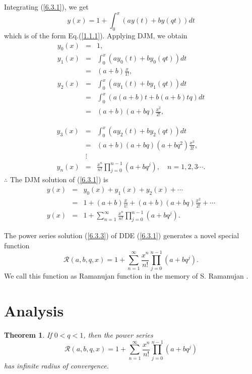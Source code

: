 \documentclass[12pt]{article}
\newtheorem{The}{Theorem}[section]
\numberwithin{equation}{section}
\begin{document}
Integrating (\ref{6.3.1}), we get
\begin{equation}
y(x)= 1 + \int_{0}^{x}\left( ay(t)+ by(qt)\right)dt\label{6.3.2}
\end{equation}
which is of the form Eq.(\ref{1.1.1}). Applying DJM, we obtain
\begin{eqnarray}
y_0(x) &=& 1 ,\nonumber\\
y_1(x)&=& \int_{0}^{x}\left( ay_0(t)+ by_0(q t)\right)dt\nonumber\\
&=& (a+b)\frac{x}{1!},\nonumber\\
y_2(x)&=& \int_{0}^{x}\left( ay_1(t)+ by_1(q t)\right)dt\nonumber\\
&=&\int_{0}^{x}\left(a (a+b)t + b (a+b)tq\right)dt\nonumber\\
&=& (a+b)(a+bq)\frac{x^2}{2!},\nonumber
\end{eqnarray}

\begin{eqnarray}
y_3(x)&=&  \int_{0}^{x}\left(ay_2(t)+ by_2(q t)\right)dt\nonumber\\
&=& (a+b)(a+bq)(a+bq^2)\frac{x^3}{3!},\nonumber\\
&\vdots& \nonumber\\
y_n(x)&=& \frac{x^n}{n!}\prod_{j=0}^{n-1}\left(a+bq^j\right), \quad n=1,2,3\cdots. 
\end{eqnarray}
$\therefore$ The DJM solution of  (\ref{6.3.1}) is 
\begin{eqnarray}
y(x) &=& y_0(x)+y_1(x)+y_2(x)+\cdots\nonumber\\
&=& 1 +  (a+b)\frac{x}{1!} + (a+b)(a+bq)\frac{x^2}{2!}+\cdots\nonumber\\
y(x) &=&  1 + \sum_{n=1}^\infty \frac{x^n}{n!}\prod_{j=0}^{n-1}\left(a+bq^j\right).\label{6.3.3}
\end{eqnarray}

The power series solution (\ref{6.3.3}) of DDE (\ref{6.3.1}) generates a novel special function 
\begin{equation}
 \mathcal{R}(a,b,q,x)=  1 + \sum_{n=1}^\infty \frac{x^n}{n!}\prod_{j=0}^{n-1}\left(a+bq^j\right).\label{6.3.4}
\end{equation}
We call this function as Ramanujan function in the memory of S. Ramanujan \cite{Kanigel}.

\section{Analysis}\label{analy}

\begin{The}
If $0<q<1$, then the power series
\begin{equation}
 \mathcal{R}(a,b,q,x)=  1 + \sum_{n=1}^\infty \frac{x^n}{n!}\prod_{j=0}^{n-1}\left(a+bq^j\right)\label{6.5.0}
\end{equation}
 has infinite radius of convergence.
\end{The}
\end{document}
